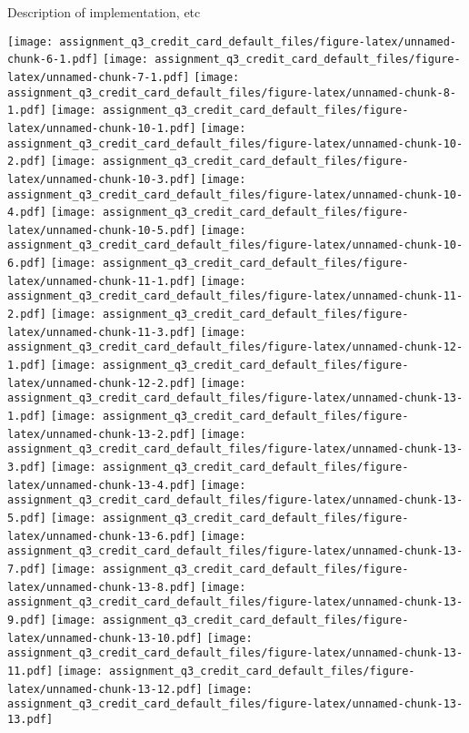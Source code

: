 
Description of implementation, etc

\texttt{[image: assignment\_q3\_credit\_card\_default\_files/figure-latex/unnamed-chunk-6-1.pdf]}
\texttt{[image: assignment\_q3\_credit\_card\_default\_files/figure-latex/unnamed-chunk-7-1.pdf]}
\texttt{[image: assignment\_q3\_credit\_card\_default\_files/figure-latex/unnamed-chunk-8-1.pdf]}
\texttt{[image: assignment\_q3\_credit\_card\_default\_files/figure-latex/unnamed-chunk-10-1.pdf]}
\texttt{[image: assignment\_q3\_credit\_card\_default\_files/figure-latex/unnamed-chunk-10-2.pdf]}
\texttt{[image: assignment\_q3\_credit\_card\_default\_files/figure-latex/unnamed-chunk-10-3.pdf]}
\texttt{[image: assignment\_q3\_credit\_card\_default\_files/figure-latex/unnamed-chunk-10-4.pdf]}
\texttt{[image: assignment\_q3\_credit\_card\_default\_files/figure-latex/unnamed-chunk-10-5.pdf]}
\texttt{[image: assignment\_q3\_credit\_card\_default\_files/figure-latex/unnamed-chunk-10-6.pdf]}
\texttt{[image: assignment\_q3\_credit\_card\_default\_files/figure-latex/unnamed-chunk-11-1.pdf]}
\texttt{[image: assignment\_q3\_credit\_card\_default\_files/figure-latex/unnamed-chunk-11-2.pdf]}
\texttt{[image: assignment\_q3\_credit\_card\_default\_files/figure-latex/unnamed-chunk-11-3.pdf]}
\texttt{[image: assignment\_q3\_credit\_card\_default\_files/figure-latex/unnamed-chunk-12-1.pdf]}
\texttt{[image: assignment\_q3\_credit\_card\_default\_files/figure-latex/unnamed-chunk-12-2.pdf]}
\texttt{[image: assignment\_q3\_credit\_card\_default\_files/figure-latex/unnamed-chunk-13-1.pdf]}
\texttt{[image: assignment\_q3\_credit\_card\_default\_files/figure-latex/unnamed-chunk-13-2.pdf]}
\texttt{[image: assignment\_q3\_credit\_card\_default\_files/figure-latex/unnamed-chunk-13-3.pdf]}
\texttt{[image: assignment\_q3\_credit\_card\_default\_files/figure-latex/unnamed-chunk-13-4.pdf]}
\texttt{[image: assignment\_q3\_credit\_card\_default\_files/figure-latex/unnamed-chunk-13-5.pdf]}
\texttt{[image: assignment\_q3\_credit\_card\_default\_files/figure-latex/unnamed-chunk-13-6.pdf]}
\texttt{[image: assignment\_q3\_credit\_card\_default\_files/figure-latex/unnamed-chunk-13-7.pdf]}
\texttt{[image: assignment\_q3\_credit\_card\_default\_files/figure-latex/unnamed-chunk-13-8.pdf]}
\texttt{[image: assignment\_q3\_credit\_card\_default\_files/figure-latex/unnamed-chunk-13-9.pdf]}
\texttt{[image: assignment\_q3\_credit\_card\_default\_files/figure-latex/unnamed-chunk-13-10.pdf]}
\texttt{[image: assignment\_q3\_credit\_card\_default\_files/figure-latex/unnamed-chunk-13-11.pdf]}
\texttt{[image: assignment\_q3\_credit\_card\_default\_files/figure-latex/unnamed-chunk-13-12.pdf]}
\texttt{[image: assignment\_q3\_credit\_card\_default\_files/figure-latex/unnamed-chunk-13-13.pdf]}
